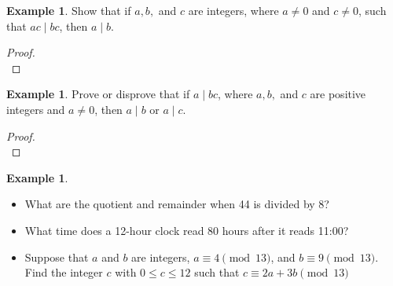 \documentclass[letterpaper,10pt]{article}
\theoremstyle{plain}
\theoremstyle{definition}
\newtheorem{exmp}[thm]{Example}
\theoremstyle{remark}
\begin{document}
\begin{exmp}

Show that if \(a, b,\) and \(c\) are integers, where \(a \neq 0\) and \(c \neq 0\), such that \(ac \mid bc\), then \(a \mid b\).

\begin{proof}$ $\\

\vspace{2cm}
\end{proof}
\end{exmp}
\begin{exmp}

Prove or disprove that if \(a \mid bc\), where \(a, b,\) and \(c\) are positive integers and \(a \neq 0\), then \(a \mid b\) or \(a \mid c\).


\begin{proof}$ $\\

\vspace{2cm}
\end{proof}
\end{exmp}
\begin{exmp}
\begin{itemize} $ $\\
\item What are the quotient and remainder when 44 is divided by 8?
\item What time does a 12-hour clock read 80 hours after it reads 11:00?
\item Suppose that \(a\) and \(b\) are integers, \(a \equiv 4 \pmod{13}\), and \(b \equiv 9 \pmod{13}\). Find the integer \(c\) with \(0 \leq c \leq 12\) such that
\(c \equiv 2a + 3b \pmod{13}\)
\end{itemize}

\end{exmp}
\newpage
\end{document}

